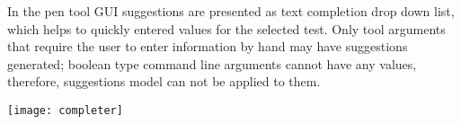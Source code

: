 In the pen tool GUI suggestions are presented as text completion drop down list, which helps to quickly entered values for the selected test. Only tool arguments that require the user to enter information by hand may have suggestions generated; boolean type command line arguments cannot have any values, therefore, suggestions model can not be applied to them. 

\begin{center}
	\begin{sideways}%
		\begin{minipage}{\textheight}
			\texttt{[image: completer]}
			\label{fig:completer}
		\end{minipage}
	\end{sideways}
\end{center}

